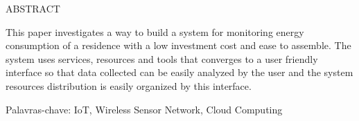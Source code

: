\begin{titlepage}

\begin{center}
\large
ABSTRACT
\end{center}

\vspace{10mm}
\large
This paper investigates a way to build a system for monitoring energy consumption of a residence with a low investment cost and ease to assemble. The system uses services, resources and tools that converges to a user friendly interface so that data collected can be easily analyzed by the user and the system resources distribution is easily organized by this interface.

\vspace{10mm}
\large
Palavras-chave: IoT, Wireless Sensor Network, Cloud Computing
\vfill


\end{titlepage}